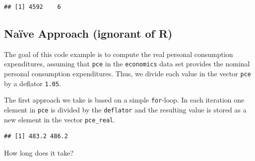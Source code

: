\documentclass[
  12pt,
]{style/krantz}
\newenvironment{Shaded}{\begin{snugshade}}{\end{snugshade}}
\newcommand{\CommentTok}[1]{\textcolor[rgb]{0.56,0.35,0.01}{\textit{#1}}}
\newcommand{\ControlFlowTok}[1]{\textcolor[rgb]{0.13,0.29,0.53}{\textbf{#1}}}
\newcommand{\DecValTok}[1]{\textcolor[rgb]{0.00,0.00,0.81}{#1}}
\newcommand{\FloatTok}[1]{\textcolor[rgb]{0.00,0.00,0.81}{#1}}
\newcommand{\FunctionTok}[1]{\textcolor[rgb]{0.00,0.00,0.00}{#1}}
\newcommand{\NormalTok}[1]{#1}
\newcommand{\OtherTok}[1]{\textcolor[rgb]{0.56,0.35,0.01}{#1}}
\newcommand{\SpecialCharTok}[1]{\textcolor[rgb]{0.00,0.00,0.00}{#1}}
\begin{document}
\begin{verbatim}
## [1] 4592    6
\end{verbatim}

\hypertarget{nauxefve-approach-ignorant-of-r}{%
\subsection{Naïve Approach (ignorant of R)}\label{nauxefve-approach-ignorant-of-r}}

The goal of this code example is to compute the real personal consumption expenditures, assuming that \texttt{pce} in the \texttt{economics} data set provides the nominal personal consumption expenditures. Thus, we divide each value in the vector \texttt{pce} by a deflator \texttt{1.05}.

The first approach we take is based on a simple \texttt{for}-loop. In each iteration one element in \texttt{pce} is divided by the \texttt{deflator} and the resulting value is stored as a new element in the vector \texttt{pce\_real}.

\begin{Shaded}
\end{Shaded}

\begin{verbatim}
## [1] 483.2 486.2
\end{verbatim}

How long does it take?
\end{document}
